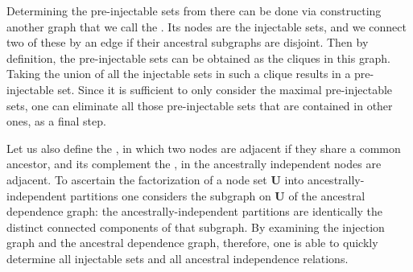 Determining the pre-injectable sets from there can be done via constructing another graph that we call the . Its nodes are the injectable sets, and we connect two of these by an edge if their ancestral subgraphs are disjoint. Then by definition, the pre-injectable sets can be obtained as the cliques in this graph. Taking the union of all the injectable sets in such a clique results in a pre-injectable set. Since it is sufficient to only consider the maximal pre-injectable sets, one can eliminate all those pre-injectable sets that are contained in other ones, as a final step.

Let us also define the , in which two nodes are adjacent if they share a common ancestor, and its complement the , in the ancestrally independent nodes are adjacent. To ascertain the factorization of a node set $\bm{U}$ into ancestrally-independent partitions one considers the subgraph on  $\bm{U}$ of the ancestral dependence graph: the ancestrally-independent partitions are identically the distinct connected components of that subgraph. By examining the injection graph and the ancestral dependence graph, therefore, one is able to quickly determine all injectable sets and all ancestral independence relations.


